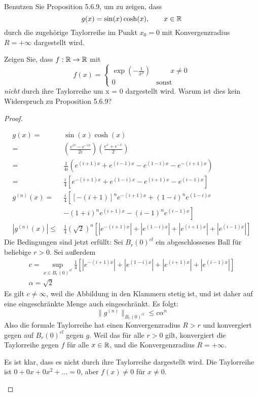 \begin{Problem}
\begin{parts}
	\item Benutzen Sie Proposition 5.6.9, um zu zeigen, dass
		\[
		g(x)=\sin(x)\cosh(x), \qquad x\in \mathbb{R}
		\] 
durch die zugehörige Taylorreihe im Punkt $x_0 = 0$ mit Konvergenzradius $R=+\infty$ dargestellt wird.
\item Zeigen Sie, dass $f:\mathbb{R}\to \mathbb{R}$ mit
	\[
	f(x)=\begin{cases}
		\exp\left( -\frac{1}{x^2} \right) & \qquad x \neq 0\\
		0 & \text{sonst}
	\end{cases}
	\]
	\emph{nicht} durch ihre Taylorreihe um x = 0 dargestellt wird. Warum ist dies kein Widerspruch zu Proposition 5.6.9?
\end{parts}	
\end{Problem}
\begin{proof}
	\begin{parts}
	\item \begin{align*}
			g(x)=&\sin(x)\cosh(x)\\
			=&\left( \frac{e^{ix}-e^{-ix}}{2i} \right) \left( \frac{e^x+e^{-x}}{2} \right) \\
			=& \frac{1}{4i}\left( e^{(i+1)x}+e^{(i-1)x}-e^{(1-i)x}-e^{-(i+1)x} \right)\\
			=& \frac{i}{4}\left[ e^{-(i+1)x}+e^{(1-i)x}-e^{(i+1)x}-e^{(i-1)x} \right]\\
			g^{(n)}(x)=&\frac{i}{4}\left[ \left[ -(i+1) \right]^n e^{-(i+1)x}+(1-i)^n e^{(1-i)x}\right.\\
 &\left.-(1+i)^n e^{(i+1)x}-(i-1)^n e^{(i-1)x} \right]\\
			|g^{(n)}(x)|\le& \frac{1}{4}(\sqrt{2})^n\left[ \left| e^{-(i+1)x} \right| +\left| e^{(1-i)x} \right| +\left| e^{(i+1)x} \right| +\left| e^{(i-1)x} \right|   \right] 
		\end{align*}
		Die Bedingungen sind jetzt erfüllt: Sei $B_r(0)^{cl}$ ein abgeschlossenes Ball für beliebige $r>0$. Sei außerdem
\begin{gather*}
			c=\sup_{x\in B_r(0)^{cl}}\frac{1}{4}\left[ \left| e^{-(i+1)x} \right| +\left| e^{(1-i)x} \right| +\left| e^{(i+1)x} \right| +\left| e^{(i-1)x} \right|   \right]\\
			\alpha=\sqrt{2} 
\end{gather*}
Es gilt $c\neq \infty$, weil die Abbildung in den Klammern stetig ist, und ist daher auf eine eingeschränkte Menge auch eingeschränkt. Es folgt:
\begin{equation}\tag{5.6.23}
	\|g^{(n)}\|_{B_r(0)^{cl}}\le c\alpha^n
\end{equation}
Also die formale Taylorreihe hat einen Konvergenzradius $R>r$ und konvergiert gegen auf $B_r(0)^{cl}$ gegen $g$. Weil das f\"{u}r alle $r>0$ gilt, konvergiert die Taylorreihe gegen $f$ f\"{u}r alle $x\in \mathbb{R}$, und die Konvergenzradius $R=+\infty$.
\item Es ist klar, dass es nicht durch ihre Taylorreihe dargestellt wird. Die Taylorreihe ist $0+0x+0x^2+\dots=0$, aber $f(x)\neq 0$ f\"{u}r $x\neq 0$.
	\end{parts}
\end{proof}
